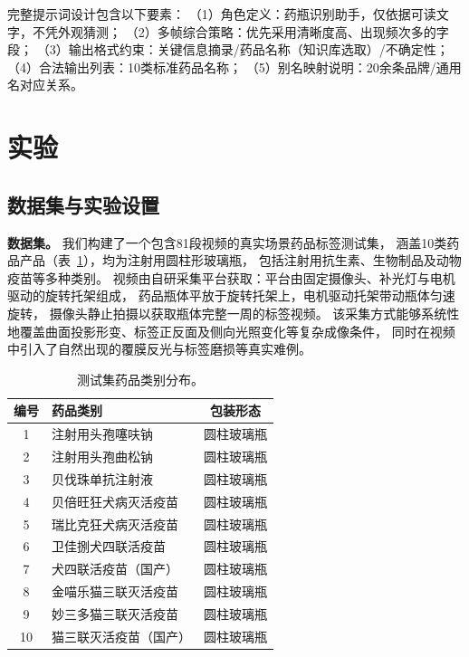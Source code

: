 \documentclass[12pt, a4paper]{article}
\begin{document}
完整提示词设计包含以下要素：
（1）角色定义：药瓶识别助手，仅依据可读文字，不凭外观猜测；
（2）多帧综合策略：优先采用清晰度高、出现频次多的字段；
（3）输出格式约束：关键信息摘录/药品名称（知识库选取）/不确定性；
（4）合法输出列表：10类标准药品名称；
（5）别名映射说明：20余条品牌/通用名对应关系。


\section{实验}
\label{sec:exp}

\subsection{数据集与实验设置}
\label{sec:exp:setup}

\noindent\textbf{数据集。}
我们构建了一个包含81段视频的真实场景药品标签测试集，
涵盖10类药品产品（表~\ref{tab:dataset}），均为注射用圆柱形玻璃瓶，
包括注射用抗生素、生物制品及动物疫苗等多种类别。
视频由自研采集平台获取：平台由固定摄像头、补光灯与电机驱动的旋转托架组成，
药品瓶体平放于旋转托架上，电机驱动托架带动瓶体匀速旋转，
摄像头静止拍摄以获取瓶体完整一周的标签视频。
该采集方式能够系统性地覆盖曲面投影形变、标签正反面及侧向光照变化等复杂成像条件，
同时在视频中引入了自然出现的覆膜反光与标签磨损等真实难例。

\begin{table}[htbp]
\centering
\caption{测试集药品类别分布。}
\label{tab:dataset}
\begin{tabular}{clc}
\toprule
编号 & 药品类别 & 包装形态 \\
\midrule
1  & 注射用头孢噻呋钠     & 圆柱玻璃瓶  \\
2  & 注射用头孢曲松钠     & 圆柱玻璃瓶  \\
3  & 贝伐珠单抗注射液     & 圆柱玻璃瓶  \\
4  & 贝倍旺狂犬病灭活疫苗  & 圆柱玻璃瓶  \\
5  & 瑞比克狂犬病灭活疫苗  & 圆柱玻璃瓶  \\
6  & 卫佳捌犬四联活疫苗   & 圆柱玻璃瓶  \\
7  & 犬四联活疫苗（国产）  & 圆柱玻璃瓶  \\
8  & 金喵乐猫三联灭活疫苗  & 圆柱玻璃瓶  \\
9  & 妙三多猫三联灭活疫苗  & 圆柱玻璃瓶  \\
10 & 猫三联灭活疫苗（国产）& 圆柱玻璃瓶  \\
\bottomrule
\end{tabular}
\end{table}
\end{document}
